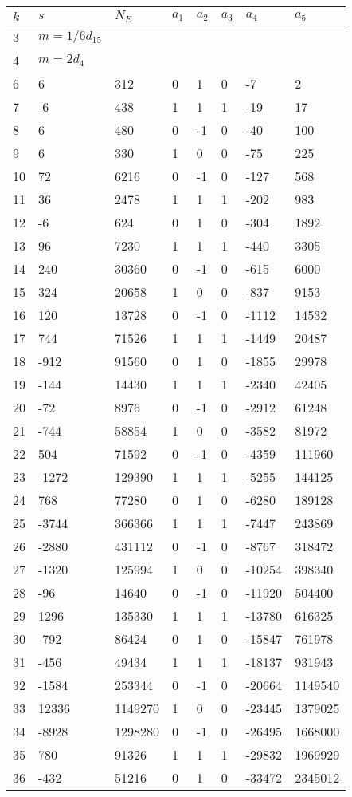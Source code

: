\documentclass{amsart}
\begin{document}
\begin{longtable}{|l|l|l|lllll|}
\hline
$k$ & $s$ & $N_E$ & $a_1$ & $a_2$ & $a_3$ & $a_4$ & $a_5$\\
\hline
3&$m=1/6d_{15}$&&\multicolumn{5}{c|}{}\\
4&$m=2d_{4}$&&\multicolumn{5}{c|}{}\\
6&6&312&0&1&0&-7&2\\
7&-6&438&1&1&1&-19&17\\
8&6&480&0&-1&0&-40&100\\
9&6&330&1&0&0&-75&225\\
10&72&6216&0&-1&0&-127&568\\
11&36&2478&1&1&1&-202&983\\
12&-6&624&0&1&0&-304&1892\\
13&96&7230&1&1&1&-440&3305\\
14&240&30360&0&-1&0&-615&6000\\
15&324&20658&1&0&0&-837&9153\\
16&120&13728&0&-1&0&-1112&14532\\
17&744&71526&1&1&1&-1449&20487\\
18&-912&91560&0&1&0&-1855&29978\\
19&-144&14430&1&1&1&-2340&42405\\
20&-72&8976&0&-1&0&-2912&61248\\
21&-744&58854&1&0&0&-3582&81972\\
22&504&71592&0&-1&0&-4359&111960\\
23&-1272&129390&1&1&1&-5255&144125\\
24&768&77280&0&1&0&-6280&189128\\
25&-3744&366366&1&1&1&-7447&243869\\
26&-2880&431112&0&-1&0&-8767&318472\\
27&-1320&125994&1&0&0&-10254&398340\\
28&-96&14640&0&-1&0&-11920&504400\\
29&1296&135330&1&1&1&-13780&616325\\
30&-792&86424&0&1&0&-15847&761978\\
31&-456&49434&1&1&1&-18137&931943\\
32&-1584&253344&0&-1&0&-20664&1149540\\
33&12336&1149270&1&0&0&-23445&1379025\\
34&-8928&1298280&0&-1&0&-26495&1668000\\
35&780&91326&1&1&1&-29832&1969929\\
36&-432&51216&0&1&0&-33472&2345012\\

\end{longtable}
\end{document}
